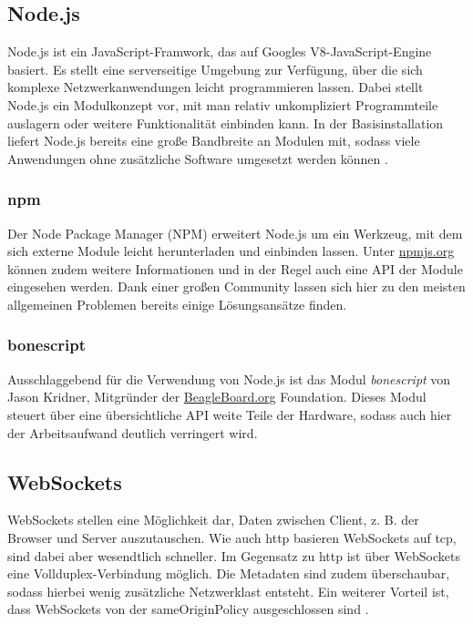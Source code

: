 \subsection{Node.js}
\label{subsec:Node.js}
Node.js ist ein JavaScript-Framwork, das auf Googles V8-JavaScript-Engine basiert. Es stellt eine serverseitige Umgebung zur Verfügung, über die sich komplexe Netzwerkanwendungen leicht programmieren lassen. Dabei stellt Node.js ein Modulkonzept vor, mit man relativ unkompliziert Programmteile auslagern oder weitere Funktionalität einbinden kann. In der Basisinstallation liefert Node.js bereits eine große Bandbreite an Modulen mit, sodass viele Anwendungen ohne zusätzliche Software umgesetzt werden können \cite{springer2013}.

\subsubsection{npm}
Der Node Package Manager (NPM) erweitert Node.js um ein Werkzeug, mit dem sich externe Module leicht herunterladen und einbinden lassen. Unter \href{https://www.npmjs.org/}{npmjs.org} können zudem weitere Informationen und in der Regel auch eine API der Module eingesehen werden. Dank einer großen Community lassen sich hier zu den meisten allgemeinen Problemen bereits einige Lösungsansätze finden.

\subsubsection{bonescript}
Ausschlaggebend für die Verwendung von Node.js ist das Modul \textit{bonescript} von Jason Kridner, Mitgründer der \href{http://beagleboard.org/}{BeagleBoard.org} Foundation. Dieses Modul steuert über eine übersichtliche API weite Teile der Hardware, sodass auch hier der Arbeitsaufwand deutlich verringert wird.

\subsection{WebSockets}
WebSockets stellen eine Möglichkeit dar, Daten zwischen Client, z. B. der Browser und Server auszutauschen. Wie auch \gls{http} basieren WebSockets auf \gls{tcp}, sind dabei aber wesendtlich schneller. Im Gegensatz zu \gls{http} ist über WebSockets eine Vollduplex-Verbindung möglich. Die Metadaten sind zudem überschaubar, sodass hierbei wenig zusätzliche Netzwerklast entsteht. Ein weiterer Vorteil ist, dass WebSockets von der \gls{sameOriginPolicy} ausgeschlossen sind \cite{rfc6455}.